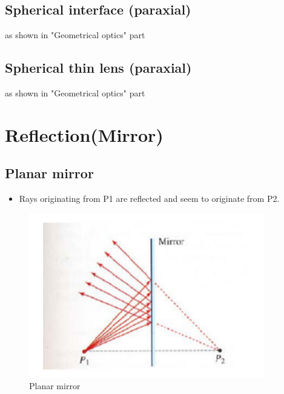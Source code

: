 \documentclass[../main.tex]{subfiles}
\begin{document}
	\subsection{Spherical interface (paraxial)}
	as shown in "Geometrical optics" part
	\subsection{Spherical thin lens (paraxial)}
	as shown in "Geometrical optics" part

	\section{Reflection(Mirror)}
	\subsection{Planar mirror}
	\begin{itemize}  
	\item Rays originating from P1 are reflected and seem to originate from P2.
	\end{itemize}
	\begin{figure}[h!]
	  \centering
	  \includegraphics[scale=0.7]{../graphics/Optical_components1.png}
	  \caption{Planar mirror}
	  \label{fig:mirror1}
	\end{figure}
\end{document}
